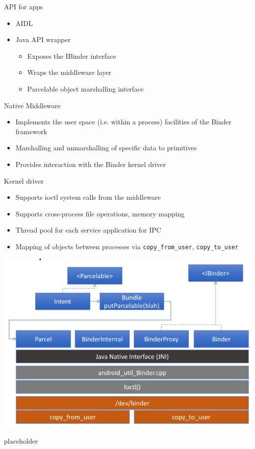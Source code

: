 \documentclass{article}
\begin{document}
\begin{flushleft}
API for apps
\begin{itemize}
  \item AIDL
  \item Java API wrapper
  \begin{itemize}
    \item  Exposes the IBinder interface
    \item Wraps the middleware layer
    \item Parcelable object marshalling interface
  \end{itemize}
\end{itemize}
Native Middleware
\begin{itemize}
  \item Implements the user space (i.e. within a process) facilities of the Binder framework
  \item Marshalling and unmarshalling of specific data to primitives 
  \item Provides interaction with the Binder kernel driver
\end{itemize}
Kernel driver
\begin{itemize}
  \item Supports ioctl system calls from the middleware
  \item Supports cross-process file operations, memory mapping
  \item Thread pool for each service application for IPC
  \item Mapping of objects between processes via \verb|copy_from_user|, \verb|copy_to_user|
\end{itemize}
\end{flushleft}

\begin{center}
  \includegraphics[scale=0.5]{binder_implem.png}
\end{center}

\newpage

\begin{description}
	\item[placeholder] \hfill \\
\end{description}
\end{document}
